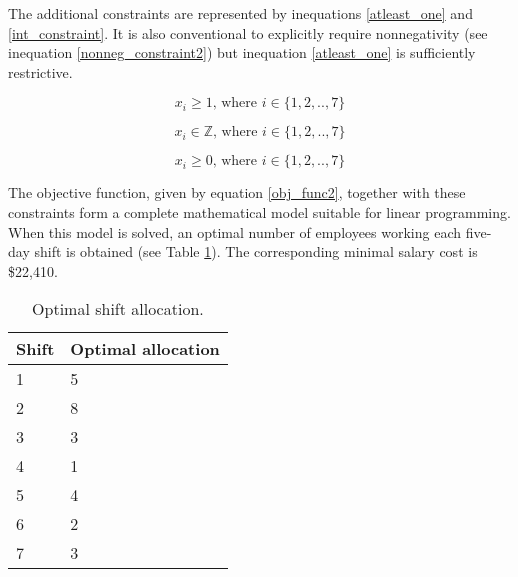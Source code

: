 \documentclass[11pt, a4paper]{article}
\begin{document}
    The additional constraints are represented by inequations \ref{atleast_one} and \ref{int_constraint}. It is also conventional to explicitly require nonnegativity (see inequation \ref{nonneg_constraint2}) but inequation \ref{atleast_one} is sufficiently restrictive.

    \begin{equation}
        x_i \geq 1 \textrm{, where } i \in \{1, 2, .., 7\}
        \label{atleast_one}
    \end{equation}

    \begin{equation}
        x_i \in \mathbb{Z} \textrm{, where } i \in \{1, 2, .., 7\}
        \label{int_constraint}
    \end{equation}

    \begin{equation}
        x_i \geq 0 \textrm{, where } i \in \{1, 2, .., 7\}
        \label{nonneg_constraint2}
    \end{equation}

    The objective function, given by equation \ref{obj_func2}, together with these constraints form a complete mathematical model suitable for linear programming. When this model is solved, an optimal number of employees working each five-day shift is obtained (see Table \ref{results2}). The corresponding minimal salary cost is \$22,410. 

    \begin{table}[!ht]
        \centering
        \caption{Optimal shift allocation.}
        \begin{tabular}{|l|l|}
            \hline
            Shift   & Optimal allocation    \\ \hline
            1       & 5                     \\ \hline
            2       & 8                     \\ \hline
            3       & 3                     \\ \hline
            4       & 1                     \\ \hline
            5       & 4                     \\ \hline
            6       & 2                     \\ \hline
            7       & 3                     \\ \hline
        \end{tabular}
        \label{results2}
    \end{table}
\end{document}
